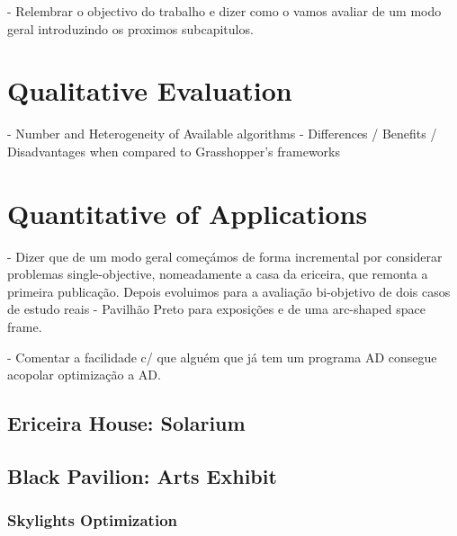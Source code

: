 \cleardoublepage
\label{chap:evaluation}

 - Relembrar o objectivo do trabalho e dizer como o vamos avaliar de um modo geral introduzindo os proximos subcapitulos.
 
\section{Qualitative Evaluation}
- Number and Heterogeneity of Available algorithms
- Differences / Benefits / Disadvantages when compared to Grasshopper's frameworks

\section{Quantitative of Applications}

- Dizer que de um modo geral começámos de forma incremental por considerar problemas single-objective, nomeadamente a casa da ericeira, que remonta a primeira publicação. Depois evoluimos para a avaliação bi-objetivo de dois casos de estudo reais - Pavilhão Preto para exposições e de uma arc-shaped space frame.

- Comentar a facilidade c/ que alguém que já tem um programa AD consegue acopolar optimização a AD.

\subsection{Ericeira House: Solarium}

\subsection{Black Pavilion: Arts Exhibit}

\subsubsection{Skylights Optimization}
